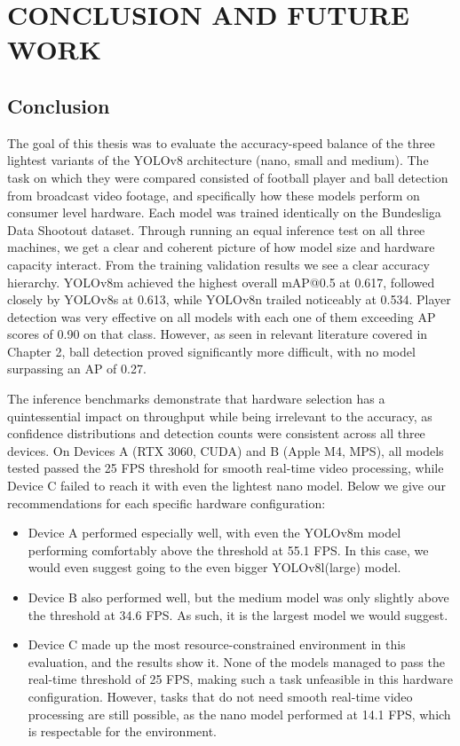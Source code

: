 \chapter{CONCLUSION AND FUTURE WORK}
\label{ch:conclusion}


\section{Conclusion}

The goal of this thesis was to evaluate the accuracy-speed balance of the three lightest variants of the YOLOv8 architecture (nano, small and medium). The task on which they were compared consisted of football player and ball detection from broadcast video footage, and specifically how these models perform on consumer level hardware. Each model was trained identically on the Bundesliga Data Shootout dataset. Through running an equal inference test on all three machines, we get a clear and coherent picture of how model size and hardware capacity interact. 
From the training validation results we see a clear accuracy hierarchy. YOLOv8m achieved the highest overall mAP@0.5 at 0.617, followed closely by YOLOv8s at 0.613, while YOLOv8n trailed noticeably at 0.534. Player detection was very effective on all models with each one of them exceeding AP scores of 0.90 on that class. However, as seen in relevant literature covered in Chapter 2, ball detection proved significantly more difficult, with no model surpassing an AP of 0.27. 

The inference benchmarks demonstrate that hardware selection has a quintessential impact on throughput while being irrelevant to the accuracy, as confidence distributions and detection counts were consistent across all three devices. On Devices A (RTX 3060, CUDA) and B (Apple M4, MPS), all models tested passed the 25 FPS threshold for smooth real-time video processing, while Device C failed to reach it with even the lightest nano model. Below we give our recommendations for each specific hardware configuration:

\begin{itemize}
    \item Device A performed especially well, with even the YOLOv8m model performing comfortably above the threshold at 55.1 FPS. In this case, we would even suggest going to the even bigger YOLOv8l(large) model. 
    \item Device B also performed well, but the medium model was only slightly above the threshold at 34.6 FPS. As such, it is the largest model we would suggest.
    \item Device C made up the most resource-constrained environment in this evaluation, and the results show it.  None of the models managed to pass the real-time threshold of 25 FPS, making such a task unfeasible in this hardware configuration. However, tasks that do not need smooth real-time video processing are still possible, as the nano model performed at 14.1 FPS, which is respectable for the environment. 
\end{itemize}

